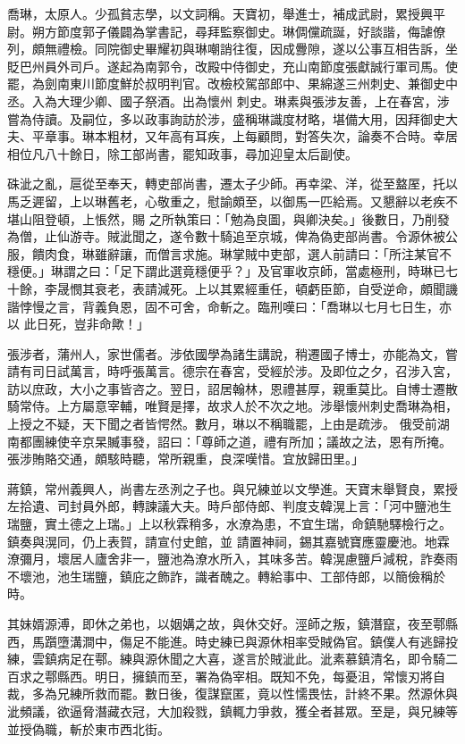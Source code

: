 \begin{pinyinscope}
 喬琳，太原人。少孤貧志學，以文詞稱。天寶初，舉進士，補成武尉，累授興平尉。朔方節度郭子儀闢為掌書記，尋拜監察御史。琳倜儻疏誕，好談諧，侮謔僚列，頗無禮檢。同院御史畢耀初與琳嘲誚往復，因成釁隙，遂以公事互相告訴，坐貶巴州員外司戶。遂起為南郭令，改殿中侍御史，充山南節度張獻誠行軍司馬。使罷，為劍南東川節度鮮於叔明判官。改檢校駕部郎中、果綿遂三州刺史、兼御史中丞。入為大理少卿、國子祭酒。出為懷州
 刺史。琳素與張涉友善，上在春宮，涉嘗為侍讀。及嗣位，多以政事詢訪於涉，盛稱琳識度材略，堪備大用，因拜御史大夫、平章事。琳本粗材，又年高有耳疾，上每顧問，對答失次，論奏不合時。幸居相位凡八十餘日，除工部尚書，罷知政事，尋加迎皇太后副使。



 硃泚之亂，扈從至奉天，轉吏部尚書，遷太子少師。再幸梁、洋，從至盩厔，托以馬乏遲留，上以琳舊老，心敬重之，慰諭頗至，以御馬一匹給焉。又懇辭以老疾不堪山阻登頓，上悵然，賜
 之所執策曰：「勉為良圖，與卿決矣。」後數日，乃削發為僧，止仙游寺。賊泚聞之，遂令數十騎追至京城，俾為偽吏部尚書。令源休被公服，饋肉食，琳雖辭讓，而僧言求施。琳掌賊中吏部，選人前請曰：「所注某官不穩便。」琳謂之曰：「足下謂此選竟穩便乎？」及官軍收京師，當處極刑，時琳已七十餘，李晟憫其衰老，表請減死。上以其累經重任，頓虧臣節，自受逆命，頗聞譏諧悖慢之言，背義負恩，固不可舍，命斬之。臨刑嘆曰：「喬琳以七月七日生，亦以
 此日死，豈非命歟！」



 張涉者，蒲州人，家世儒者。涉依國學為諸生講說，稍遷國子博士，亦能為文，嘗請有司日試萬言，時呼張萬言。德宗在春宮，受經於涉。及即位之夕，召涉入宮，訪以庶政，大小之事皆咨之。翌日，詔居翰林，恩禮甚厚，親重莫比。自博士遷散騎常侍。上方屬意宰輔，唯賢是擇，故求人於不次之地。涉舉懷州刺史喬琳為相，上授之不疑，天下聞之者皆愕然。數月，琳以不稱職罷，上由是疏涉。
 俄受前湖南都團練使辛京杲贓事發，詔曰：「尊師之道，禮有所加；議故之法，恩有所掩。張涉賄賂交通，頗駭時聽，常所親重，良深嘆惜。宜放歸田里。」



 蔣鎮，常州義興人，尚書左丞洌之子也。與兄練並以文學進。天寶末舉賢良，累授左拾遺、司封員外郎，轉諫議大夫。時戶部侍郎、判度支韓滉上言：「河中鹽池生瑞鹽，實土德之上瑞。」上以秋霖稍多，水潦為患，不宜生瑞，命鎮馳驛檢行之。鎮奏與滉同，仍上表賀，請宣付史館，並
 請置神祠，錫其嘉號寶應靈慶池。地霖潦彌月，壞居人廬舍非一，鹽池為潦水所入，其味多苦。韓滉慮鹽戶減稅，詐奏雨不壞池，池生瑞鹽，鎮庇之飾詐，識者醜之。轉給事中、工部侍郎，以簡儉稱於時。



 其妹婿源溥，即休之弟也，以姻媾之故，與休交好。涇師之叛，鎮潛竄，夜至鄠縣西，馬躓墮溝澗中，傷足不能進。時史練已與源休相率受賊偽官。鎮僕人有逃歸投練，雲鎮病足在鄠。練與源休聞之大喜，遂言於賊泚此。泚素慕鎮清名，即令騎二
 百求之鄠縣西。明日，擁鎮而至，署為偽宰相。既知不免，每憂沮，常懷刃將自裁，多為兄練所救而罷。數日後，復謀竄匿，竟以性懦畏怯，計終不果。然源休與泚頻議，欲逼脅潛藏衣冠，大加殺戮，鎮輒力爭救，獲全者甚眾。至是，與兄練等並授偽職，斬於東市西北街。




\end{pinyinscope}
